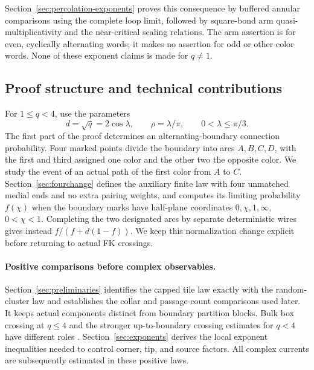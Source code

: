Section~\ref{sec:percolation-exponents} proves this consequence by
buffered annular comparisons using the complete loop limit, followed
by square-bond arm quasi-multiplicativity and the near-critical
scaling relations.  The arm assertion is for even, cyclically
alternating words; it makes no assertion for odd or other color words.
None of these exponent claims is made for $q\ne1$.

\subsection{Proof structure and technical contributions}

For $1\le q<4$, use the parameters
\begin{equation}\label{intro:lambda-rho}
 d=\sqrt q=2\cos\lambda,\qquad
 \rho=\lambda/\pi,\qquad 0<\lambda\le\pi/3.
\end{equation}
The first part of the proof determines an alternating-boundary
connection probability.  Four marked points divide the boundary into
arcs $A,B,C,D$, with the first and third assigned one color and
the other two the opposite color.  We study the event of an actual
path of the first color from $A$ to $C$.  Section~\ref{sec:fourchange} defines the
auxiliary finite law with four unmatched medial ends and no extra
pairing weights, and computes its limiting probability $f(\chi)$ when
the boundary marks have half-plane coordinates $0,\chi,1,\infty$,
$0<\chi<1$.  Completing the two designated arcs by separate
deterministic wires gives instead $f/(f+d(1-f))$.  We keep this
normalization change explicit before returning to actual FK crossings.

\paragraph{Positive comparisons before complex observables.}
Section~\ref{sec:preliminaries} identifies the capped tile law exactly
with the random-cluster law and establishes the collar and passage-count
comparisons used later.  It keeps actual components distinct from
boundary partition blocks.  Bulk box crossing at $q\le4$ and the stronger
up-to-boundary crossing estimates for $q<4$ have different roles
\citep{DCLM2019Isoradial,DMT2021Fractal}.  Section~\ref{sec:exponents}
derives the local exponent inequalities needed to control corner, tip,
and source factors.  All complex currents are subsequently estimated in
these positive laws.

